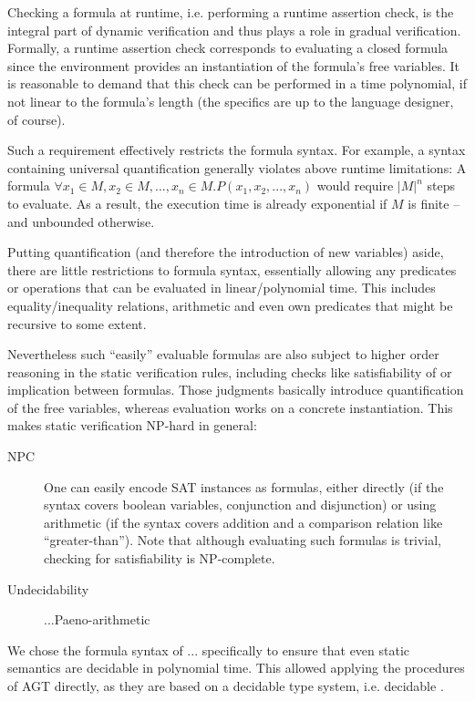 Checking a formula at runtime, i.e. performing a runtime assertion check, is the integral part of dynamic verification and thus plays a role in gradual verification.
Formally, a runtime assertion check corresponds to evaluating a closed formula since the environment provides an instantiation of the formula's free variables.
It is reasonable to demand that this check can be performed in a time polynomial, if not linear to the formula's length (the specifics are up to the language designer, of course).

Such a requirement effectively restricts the formula syntax.
For example, a syntax containing universal quantification generally violates above runtime limitations:
A formula $\forall x_1 \in M, x_2 \in M, ..., x_n \in M. P(x_1, x_2, ..., x_n)$ would require $|M|^n$ steps to evaluate.
As a result, the execution time is already exponential if $M$ is finite -- and unbounded otherwise.

Putting quantification (and therefore the introduction of new variables) aside, there are little restrictions to formula syntax, essentially allowing any predicates or operations that can be evaluated in linear/polynomial time.
This includes equality/inequality relations, arithmetic and even own predicates that might be recursive to some extent.

Nevertheless such “easily” evaluable formulas are also subject to higher order reasoning in the static verification rules, including checks like satisfiability of or implication between formulas.
Those judgments basically introduce quantification of the free variables, whereas evaluation works on a concrete instantiation.
This makes static verification NP-hard in general:
\begin{description}
    \item[NPC] One can easily encode SAT instances as formulas, either directly (if the syntax covers boolean variables, conjunction and disjunction) or using arithmetic (if the syntax covers addition and a comparison relation like “greater-than”). Note that although evaluating such formulas is trivial, checking for satisfiability is NP-complete. %
    \item[Undecidability] ...Paeno-arithmetic %
\end{description}

We chose the formula syntax of ... specifically to ensure that even static semantics are decidable in polynomial time.
This allowed applying the procedures of AGT directly, as they are based on a decidable type system, i.e. decidable .

